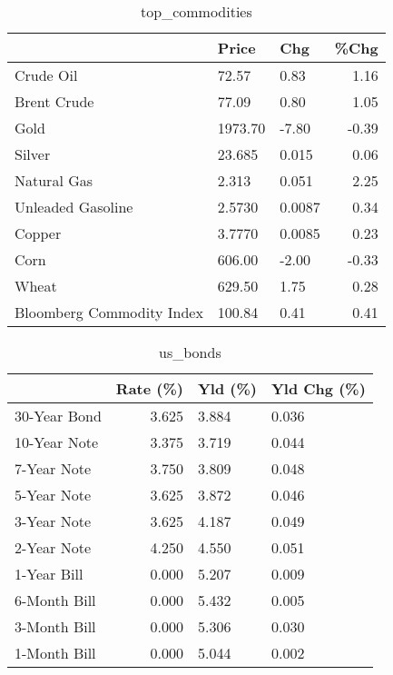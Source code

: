 \documentclass{article}%
\begin{document}
\begin{table}[htbp]%
\caption{top\_commodities}%
\centering%
\begin{adjustbox}{width=1\textwidth}%
\begin{tabular}{lllr}
\toprule
                          &   Price &    Chg &  \%Chg \\
\midrule
               Crude Oil  &   72.57 &   0.83 &  1.16 \\
             Brent Crude  &   77.09 &   0.80 &  1.05 \\
                    Gold  & 1973.70 &  -7.80 & -0.39 \\
                  Silver  &  23.685 &  0.015 &  0.06 \\
             Natural Gas  &   2.313 &  0.051 &  2.25 \\
       Unleaded Gasoline  &  2.5730 & 0.0087 &  0.34 \\
                  Copper  &  3.7770 & 0.0085 &  0.23 \\
                    Corn  &  606.00 &  -2.00 & -0.33 \\
                   Wheat  &  629.50 &   1.75 &  0.28 \\
Bloomberg Commodity Index &  100.84 &   0.41 &  0.41 \\
\bottomrule
\end{tabular}
%
\end{adjustbox}%
\end{table}

%


\begin{table}[htbp]%
\caption{us\_bonds}%
\centering%
\begin{adjustbox}{width=1\textwidth}%
\begin{tabular}{lrll}
\toprule
             &  Rate (\%) & Yld (\%) & Yld Chg (\%) \\
\midrule
30-Year Bond &     3.625 &   3.884 &       0.036 \\
10-Year Note &     3.375 &   3.719 &       0.044 \\
 7-Year Note &     3.750 &   3.809 &       0.048 \\
 5-Year Note &     3.625 &   3.872 &       0.046 \\
 3-Year Note &     3.625 &   4.187 &       0.049 \\
 2-Year Note &     4.250 &   4.550 &       0.051 \\
 1-Year Bill &     0.000 &   5.207 &       0.009 \\
6-Month Bill &     0.000 &   5.432 &       0.005 \\
3-Month Bill &     0.000 &   5.306 &       0.030 \\
1-Month Bill &     0.000 &   5.044 &       0.002 \\
\bottomrule
\end{tabular}
%
\end{adjustbox}%
\end{table}
\end{document}
